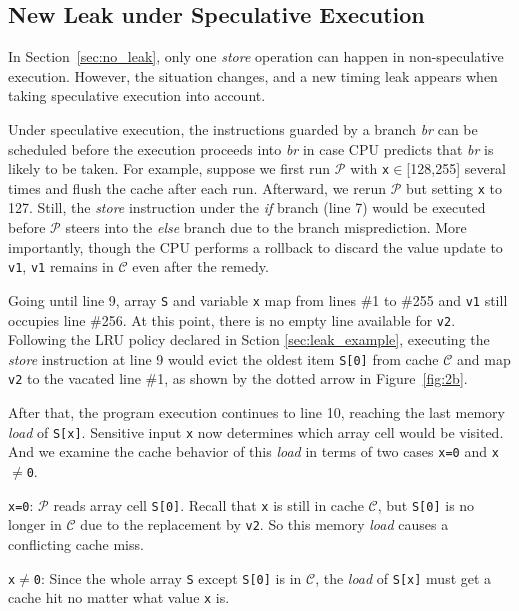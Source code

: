 \documentclass[sigconf]{acmart}
\newcommand{\prog}{\mathcal{P}}
\begin{document}
\subsection{New Leak under Speculative Execution}
\label{sec:specu_leak}

In Section~\ref{sec:no_leak}, only one \textit{store} operation can happen 
in non-speculative execution. However, the situation changes, and a new timing 
leak appears when taking speculative execution into account.  


Under speculative execution, the instructions guarded by a branch \emph{br} can 
be scheduled before the execution proceeds into \emph{br} in case CPU predicts 
that \emph{br} is likely to be taken. For example, suppose we first run $\prog$ 
with \texttt{x}$\in$[128,255] several times and flush the cache after each run. 
Afterward, we rerun $\prog$ but setting \texttt{x} to 127. Still, the 
\textit{store} instruction under the \emph{if} branch (line 7) would be executed 
before $\prog$ steers into the \emph{else} branch due to the branch misprediction. 
More importantly, though the CPU performs a rollback to discard the value update 
to \texttt{v1}, \texttt{v1} remains in $\mathcal{C}$ even after the remedy. 


Going until line 9, array \texttt{S} and variable \texttt{x} map from lines \#1 
to \#255 and \texttt{v1} still occupies line \#256. At this point, there is no 
empty line available for \texttt{v2}. Following the LRU policy declared in Sction
\ref{sec:leak_example}, executing the \textit{store} instruction at line 9 would 
evict the oldest item \texttt{S[0]} from cache $\mathcal{C}$ and map \texttt{v2} 
to the vacated line \#1, as shown by the dotted arrow in Figure~\ref{fig:2b}.


After that, the program execution continues to line 10, reaching the last memory 
\textit{load} of \texttt{S[x]}. Sensitive input \texttt{x} now determines which 
array cell would be visited. And we examine the cache behavior of this \textit{load} 
in terms of two cases \texttt{x=0} and \texttt{x$\neq$0}.


\begin{itemize*}
  \item \texttt{x=0}: $\prog$ reads array cell \texttt{S[0]}. Recall that \texttt{x} 
	is still in cache $\mathcal{C}$, but \texttt{S[0]} is no longer in $\mathcal{C}$ 
	due to the replacement by \texttt{v2}. So this memory \textit{load}	causes a 
	conflicting cache miss.
  \item \texttt{x$\neq$0}: Since the whole array \texttt{S} except \texttt{S[0]}
    is in $\mathcal{C}$, the \textit{load} of \texttt{S[x]} must get a cache hit 
		no matter what value \texttt{x} is.
\end{itemize*}
\end{document}
